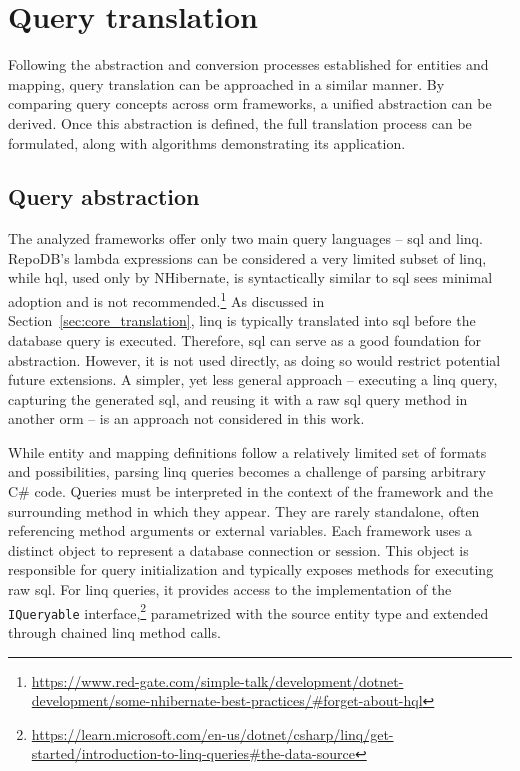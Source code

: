 \chapter{Query translation}\label{chapter:query_translation}
Following the abstraction and conversion processes established for entities and mapping, query translation can be approached in a similar manner. By comparing query concepts across \acrshort{orm} frameworks, a unified abstraction can be derived. Once this abstraction is defined, the full translation process can be formulated, along with algorithms demonstrating its application. 


\section{Query abstraction}
The analyzed frameworks offer only two main query languages -- \acrshort{sql} and \acrshort{linq}. RepoDB's lambda expressions can be considered a very limited subset of \acrshort{linq}, while \acrshort{hql}, used only by NHibernate, is syntactically similar to \acrshort{sql} sees minimal adoption and is not recommended.\footnote{\url{https://www.red-gate.com/simple-talk/development/dotnet-development/some-nhibernate-best-practices/\#forget-about-hql}} As discussed in Section~\ref{sec:core_translation}, \acrshort{linq} is typically translated into \acrshort{sql} before the database query is executed. Therefore, \acrshort{sql} can serve as a good foundation for abstraction. However, it is not used directly, as doing so would restrict potential future extensions. A simpler, yet less general approach -- executing a \acrshort{linq} query, capturing the generated \acrshort{sql}, and reusing it with a raw \acrshort{sql} query method in another \acrshort{orm} -- is an approach not considered in this work.

While entity and mapping definitions follow a relatively limited set of formats and possibilities, parsing \acrshort{linq} queries becomes a challenge of parsing arbitrary C\# code. Queries must be interpreted in the context of the framework and the surrounding method in which they appear. They are rarely standalone, often referencing method arguments or external variables. Each framework uses a distinct object to represent a database connection or session. This object is responsible for query initialization and typically exposes methods for executing raw \acrshort{sql}. For \acrshort{linq} queries, it provides access to the implementation of the \texttt{IQueryable} interface,\footnote{\url{https://learn.microsoft.com/en-us/dotnet/csharp/linq/get-started/introduction-to-linq-queries\#the-data-source}} parametrized with the source entity type and extended through chained \acrshort{linq} method calls.

